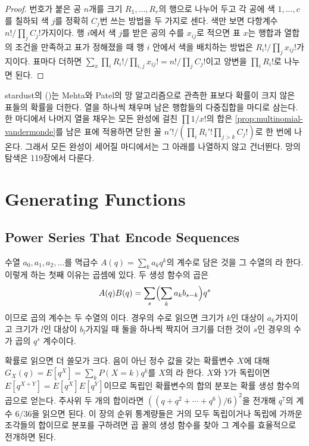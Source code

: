 \begin{proof}
번호가 붙은 공 $n$개를 크기 $R_1,\dots,R_r$의 행으로 나누어 두고 각 공에 색 $1,\dots,c$를 칠하되 색 $j$를 정확히 $C_j$번 쓰는 방법을 두 가지로 센다. 색만 보면 다항계수 $n!/\prod_jC_j!$가지이다. 행 $i$에서 색 $j$를 받은 공의 수를 $x_{ij}$로 적으면 표 $x$는 행합과 열합의 조건을 만족하고 표가 정해졌을 때 행 $i$ 안에서 색을 배치하는 방법은 $R_i!/\prod_jx_{ij}!$가지이다. 표마다 더하면 $\sum_x\prod_iR_i!/\prod_{i,j}x_{ij}!=n!/\prod_jC_j!$이고 양변을 $\prod_iR_i!$로 나누면 된다.
\end{proof}

stardust의 ()는 Mehta와 Patel의 망 알고리즘\cite{mehta1983}으로 관측한 표보다 확률이 크지 않은 표들의 확률을 더한다. 열을 하나씩 채우며 남은 행합들의 다중집합을 마디로 삼는다. 한 마디에서 나머지 열을 채우는 모든 완성에 걸친 $\prod1/x!$의 합은 \cref{prop:multinomial-vandermonde}를 남은 표에 적용하면 닫힌 꼴 $n'!/(\prod_iR_i'!\prod_{j>k}C_j!)$로 한 번에 나온다. 그래서 모든 완성이 세어질 마디에서는 그 아래를 나열하지 않고 건너뛴다. 망의 탐색은 119장에서 다룬다.

\section{Generating Functions}
\label{sec:gf}

\subsection{Power Series That Encode Sequences}

수열 $a_0,a_1,a_2,\dots$를 멱급수 $A(q)=\sum_ka_kq^k$의 계수로 담은 것을 그 수열의 라 한다. 이렇게 하는 첫째 이유는 곱셈에 있다. 두 생성 함수의 곱은
\[
A(q)B(q)=\sum_s\Bigl(\sum_{k}a_kb_{s-k}\Bigr)q^s
\]
이므로 곱의 계수는 두 수열의 이다. 경우의 수로 읽으면 크기가 $k$인 대상이 $a_k$가지이고 크기가 $l$인 대상이 $b_l$가지일 때 둘을 하나씩 짝지어 크기를 더한 것이 $s$인 경우의 수가 곱의 $q^s$ 계수이다.

확률로 읽으면 더 쓸모가 크다. 음이 아닌 정수 값을 갖는 확률변수 $X$에 대해 $G_X(q)=E[q^X]=\sum_kP(X=k)q^k$를 $X$의 라 한다. $X$와 $Y$가 독립이면 $E[q^{X+Y}]=E[q^X]E[q^Y]$이므로 독립인 확률변수의 합의 분포는 확률 생성 함수의 곱으로 얻는다. 주사위 두 개의 합이라면 $((q+q^2+\cdots+q^6)/6)^2$을 전개해 $q^7$의 계수 $6/36$을 읽으면 된다. 이 장의 순위 통계량들은 거의 모두 독립이거나 독립에 가까운 조각들의 합이므로 분포를 구하려면 곱 꼴의 생성 함수를 찾아 그 계수를 효율적으로 전개하면 된다.

